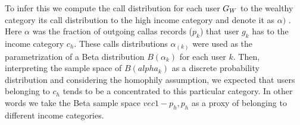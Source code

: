 To infer this we compute the call distribution for each user $ \mathlarger{G}_W $ to the wealthy category its call distribution to the high income category and denote it as $\alpha)$ . Here $\alpha$ was the fraction of outgoing callas records ($p_k$) that user $g_k$ has to the income category $c_h$. These calls distributions $\alpha_{(k)}$ were used as the parametrization of a Beta distribution $B(\alpha_k)$ for each user $k$. Then, interpreting the sample space of $B(alpha_k)$ as a discrete probability distribution and considering the homophily assumption,  we expected that users belonging to $c_h$ tends to be a concentrated to this particular category. In other words we take the Beta sample space $vec{1-p_h,p_h}$ as a proxy of belonging to different income categories.

